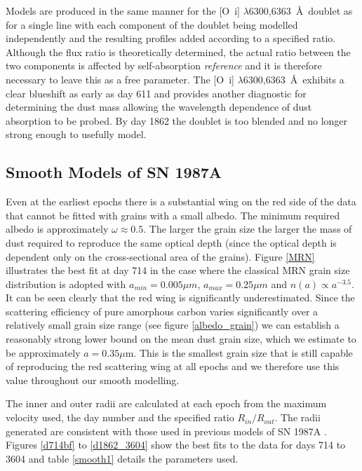 \documentclass[useAMS,usenatbib,usegraphicx]{mnras}
\begin{document}
Models are produced in the same manner for the [O~{\sc i}] 
$\lambda$6300,6363~\AA\ doublet as for a single line with each component 
of the doublet being modelled independently and the resulting profiles 
added according to a specified ratio.  Although the flux ratio is 
theoretically determined, the actual ratio between the two components is 
affected by self-absorption \textit{reference} and it is therefore 
necessary to leave this as a free parameter.  The [O~{\sc i}] 
$\lambda$6300,6363~\AA\ exhibits a clear blueshift as early as day 611 
and provides another diagnostic for determining the dust mass allowing 
the wavelength dependence of dust absorption to be probed.  By day 1862 
the doublet is too blended and no longer strong enough to usefully 
model.


\subsection{Smooth Models of SN 1987A}
\label{smooth_models}

Even at the earliest epochs there is a substantial wing on the red side of 
the data that cannot be fitted with grains with a small albedo.  The 
minimum required albedo is approximately $\omega \approx 0.5$.  The larger 
the grain size the larger the mass of dust required to reproduce the same 
optical depth (since the optical depth is dependent only on the 
cross-sectional area of the grains).  Figure \ref{MRN} illustrates the 
best fit at day 714 in the case where the classical MRN grain size 
distribution is adopted with $a_{min}=0.005 \mu m$, $a_{max}=0.25 \mu m$ 
and $n(a) \propto a^{-3.5}$.  It can be seen clearly that the red wing is 
significantly underestimated.  Since the scattering efficiency of pure 
amorphous carbon varies significantly over a relatively small grain size 
range (see figure \ref{albedo_grain}) we can establish a reasonably strong 
lower bound on the mean dust grain size, which we estimate to be 
approximately $a=0.35\mu$m.  This is the smallest grain size that is still 
capable of reproducing the red scattering wing at all epochs and we 
therefore use this value throughout our smooth modelling.

The inner and outer radii are calculated at each epoch from the maximum 
velocity used, the day number and the specified ratio $R_{in}/R_{out}$.  
The radii generated are consistent with those used in previous models of 
SN 1987A \citep{Wesson2015,Ercolano2007}.  Figures \ref{d714bf} to 
\ref{d1862_3604} show the best fits to the data for days 714 to 3604 and 
table \ref{smooth1} details the parameters used.
\end{document}

